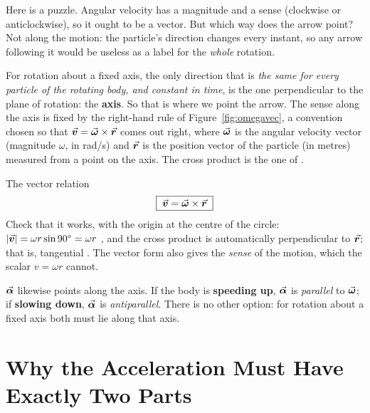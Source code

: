 Here is a puzzle. Angular velocity has a magnitude and a sense (clockwise or anticlockwise), so it
ought to be a vector. But which way does the arrow point? Not along the motion: the particle's
direction changes every instant, so any arrow following it would be useless as a label for the
\emph{whole} rotation.

For rotation about a fixed axis, the only direction that is \emph{the same for every particle of the
rotating body, and constant in time}, is the one perpendicular to the plane of rotation: the
\textbf{axis}. So that is where we point the arrow. The sense along the axis is fixed by the right-hand
rule of Figure~\ref{fig:omegavec}, a convention chosen so that $\vec{\bm{v}}=\vec{\bm{\omega}}\times\vec{\bm{r}}$ comes out right, where $\vec{\bm{\omega}}$ is the angular velocity vector (magnitude $\omega$, in \si{rad/s}) and $\vec{\bm{r}}$ is the position vector of the particle (in metres) measured from a point on the axis. The cross product is the one of .


\begin{figure}[htbp]
\centering
{}
\end{figure}

\begin{keybox}{The vector relation}
\[
\boxed{\;\vec{\bm{v}}=\vec{\bm{\omega}}\times\vec{\bm{r}}\;}
\]
Check that it works, with the origin at the centre of the circle:
$|\vec{\bm{v}}|=\omega r\sin90^\circ=\omega r$ \checkmark, and the cross product is
automatically perpendicular to $\vec{\bm{r}}$; that is, tangential \checkmark. The vector form also gives the
\emph{sense} of the motion, which the scalar $v=\omega r$ cannot.

\medskip
$\vec{\bm{\alpha}}$ likewise points along the axis. If the body is \textbf{speeding up}, $\vec{\bm{\alpha}}$ is
\emph{parallel} to $\vec{\bm{\omega}}$; if \textbf{slowing down}, $\vec{\bm{\alpha}}$ is \emph{antiparallel}. There is no
other option: for rotation about a fixed axis both must lie along that axis.
\end{keybox}

\section{Why the Acceleration Must Have Exactly Two Parts}\label{sec:twoparts}

